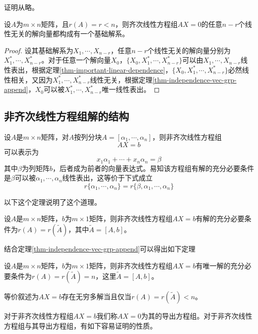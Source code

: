 证明从略。

\begin{example}
    设$A$为$m\times n$矩阵，且$r(A)=r<n$，则齐次线性方程组$AX=0$的任意$n-r$个线性无关的解向量都构成有一个基础解系。
\end{example}

\begin{proof}
    设其基础解系为$X_1,\cdots,X_{n-r}$，任意$n-r$个线性无关的解向量分别为$X_1^*,\cdots,X_{n-r}^*$。对于任意一个解向量$X_0$，$\{X_0,X_1^*,\cdots,X_{n-r}^*\}$可以由$X_1,\cdots,X_{n-r}$线性表出，根据定理\ref{thm-important-linear-dependence}，$\{X_0,X_1^*,\cdots,X_{n-r}^*\}$必然线性相关，又因为$X_1^*,\cdots,X_{n-r}^*$线性无关，根据定理\ref{thm-independence-vec-grp-append}，$X_0$可以被$X_1^*,\cdots,X_{n-r}^*$唯一线性表出。
\end{proof}

\subsection{非齐次线性方程组解的结构}

设$A$是$m\times n$矩阵，对$A$按列分块$A=[\alpha_1,\cdots,\alpha_n]$，则非齐次线性方程组
\[
    AX=b
\]
可以表示为
\[
    x_1\alpha_1+\cdots+x_n\alpha_n=\beta
\]
其中$\beta$为列矩阵$b$，后者成为前者的向量表达式。易知该方程组有解的充分必要条件是$\beta$可以被$\alpha_1,\cdots,\alpha_n$线性表出，这等价于下式成立
\[
    r\{\alpha_1,\cdots,\alpha_n\}=r\{\beta,\alpha_1,\cdots,\alpha_n\}
\]

以下这个定理说明了这个道理。

\begin{thm}
    \label{thm-not-homo-equations-solvable}
    设$A$是$m\times n$矩阵，$b$为$m\times 1$矩阵，则非齐次线性方程组$AX=b$有解的充分必要条件为$r(A)=r(\tilde{A})$，其中$\tilde{A}=[A,b]$。
\end{thm}

结合定理\ref{thm-independence-vec-grp-append}可以得出如下定理

\begin{thm}
    \label{thm-not-homo-equations-single-solution}
    设$A$是$m\times n$矩阵，$b$为$m\times 1$矩阵，则非齐次线性方程组$AX=b$有唯一解的充分必要条件为$r(A)=r(\tilde{A})=n$，这里$\tilde{A}=[A,b]$。

    等价叙述为$AX=b$存在无穷多解当且仅当$r(A)=r(\tilde{A})<n$。
\end{thm}

对于非齐次线性方程组$AX=b$我们称$AX=0$为其的导出方程组。对于非齐次线性方程组与其导出方程组，有如下容易证明的性质。

